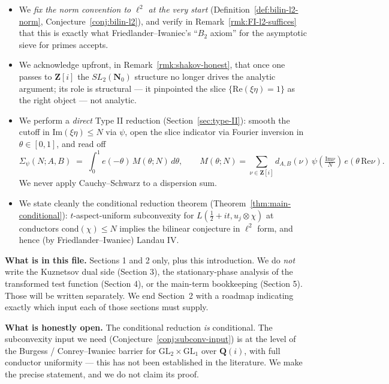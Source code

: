 \documentclass[11pt]{article}
\theoremstyle{definition}
\newcommand{\Nz}{\mathbf{N}_0}
\newcommand{\Z}{\mathbf{Z}}
\newcommand{\Q}{\mathbf{Q}}
\newcommand{\Zi}{\Z[i]}
\newcommand{\Qi}{\Q(i)}
\newcommand{\SLNz}{SL_2(\Nz)}
\renewcommand{\Re}{\mathrm{Re}}
\renewcommand{\Im}{\mathrm{Im}}
\newcommand{\cond}{\mathrm{cond}}
\begin{document}
\begin{itemize}
\item We \emph{fix the norm convention to $\ell^2$ at the very start} (Definition~\ref{def:bilin-l2-norm}, Conjecture~\ref{conj:bilin-l2}), and verify in Remark~\ref{rmk:FI-l2-suffices} that this is exactly what Friedlander--Iwaniec's ``$B_2$ axiom'' for the asymptotic sieve for primes accepts.
\item We acknowledge upfront, in Remark~\ref{rmk:shakov-honest}, that once one passes to $\Zi$ the $\SLNz$ structure no longer drives the analytic argument; its role is structural --- it pinpointed the slice $\{\Re(\xi\eta)=1\}$ as the right object --- not analytic.
\item We perform a \emph{direct} Type II reduction (Section~\ref{sec:type-II}): smooth the cutoff in $\Im(\xi\eta)\le N$ via $\psi$, open the slice indicator via Fourier inversion in $\theta\in[0,1]$, and read off
\[
\Sigma_\psi(N;A,B)\;=\;\int_0^1 e(-\theta)\,M(\theta;N)\,d\theta,\qquad M(\theta;N)=\sum_{\nu\in\Zi}d_{A,B}(\nu)\,\psi\!\left(\tfrac{\Im\nu}{N}\right)\,e(\theta\,\Re\nu).
\]
We never apply Cauchy--Schwarz to a dispersion sum.
\item We state cleanly the conditional reduction theorem (Theorem~\ref{thm:main-conditional}): $t$-aspect-uniform subconvexity for $L(\tfrac12+it,u_j\otimes\chi)$ at conductors $\cond(\chi)\le N$ implies the bilinear conjecture in $\ell^2$ form, and hence (by Friedlander--Iwaniec) Landau IV.
\end{itemize}

\noindent\textbf{What is in this file.} Sections 1 and 2 only, plus this introduction. We do \emph{not} write the Kuznetsov dual side (Section 3), the stationary-phase analysis of the transformed test function (Section 4), or the main-term bookkeeping (Section 5). Those will be written separately. We end Section~2 with a roadmap indicating exactly which input each of those sections must supply.

\noindent\textbf{What is honestly open.} The conditional reduction \emph{is} conditional. The subconvexity input we need (Conjecture~\ref{conj:subconv-input}) is at the level of the Burgess / Conrey--Iwaniec barrier for $\mathrm{GL}_2\times\mathrm{GL}_1$ over $\Qi$, with full conductor uniformity --- this has not been established in the literature. We make the precise statement, and we do not claim its proof.

\end{document}

